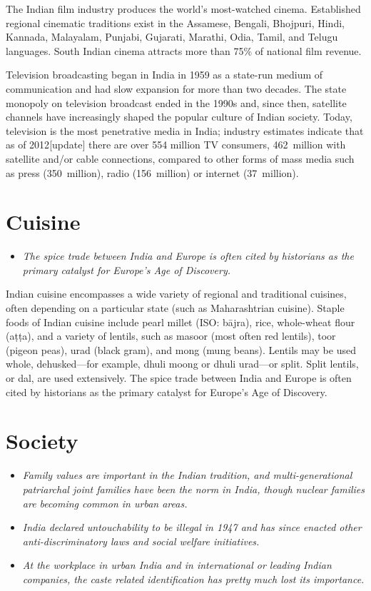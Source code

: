 The Indian film industry produces the world's most-watched cinema.
Established regional cinematic traditions exist in the Assamese,
Bengali, Bhojpuri, Hindi, Kannada, Malayalam, Punjabi, Gujarati,
Marathi, Odia, Tamil, and Telugu languages. South Indian cinema attracts
more than 75\% of national film revenue.

Television broadcasting began in India in 1959 as a state-run medium of
communication and had slow expansion for more than two decades. The
state monopoly on television broadcast ended in the 1990s and, since
then, satellite channels have increasingly shaped the popular culture of
Indian society. Today, television is the most penetrative media in
India; industry estimates indicate that as of 2012{[}update{]} there are
over 554 million TV consumers, 462~million with satellite and/or cable
connections, compared to other forms of mass media such as press
(350~million), radio (156~million) or internet (37~million).

\section{Cuisine}\label{cuisine}

\begin{itemize}
\item
  \emph{The spice trade between India and Europe is often cited by
  historians as the primary catalyst for Europe's Age of Discovery.}
\end{itemize}

Indian cuisine encompasses a wide variety of regional and traditional
cuisines, often depending on a particular state (such as Maharashtrian
cuisine). Staple foods of Indian cuisine include pearl millet (ISO:
bājra), rice, whole-wheat flour (aṭṭa), and a variety of lentils, such
as masoor (most often red lentils), toor (pigeon peas), urad (black
gram), and mong (mung beans). Lentils may be used whole, dehusked---for
example, dhuli moong or dhuli urad---or split. Split lentils, or dal,
are used extensively. The spice trade between India and Europe is often
cited by historians as the primary catalyst for Europe's Age of
Discovery.

\section{Society}\label{society}

\begin{itemize}
\item
  \emph{Family values are important in the Indian tradition, and
  multi-generational patriarchal joint families have been the norm in
  India, though nuclear families are becoming common in urban areas.}
\item
  \emph{India declared untouchability to be illegal in 1947 and has
  since enacted other anti-discriminatory laws and social welfare
  initiatives.}
\item
  \emph{At the workplace in urban India and in international or leading
  Indian companies, the caste related identification has pretty much
  lost its importance.}
\end{itemize}

